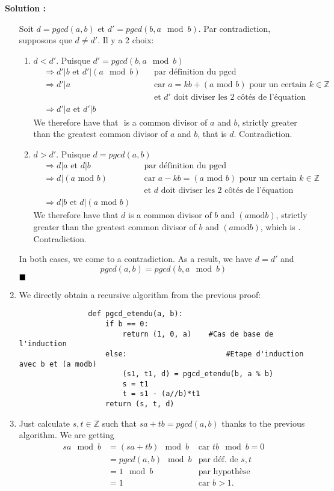 \documentclass[11pt]{article} %
\newenvironment{solution}[1][\unskip]{%
	\par
	\noindent
	\textbf{Solution #1:}
	\noindent}
{\medskip}
\begin{document}
\begin{solution}
\begin{enumerate}
			Soit $d = pgcd(a,b)$ et $d'=pgcd(b, a\mod b)$. Par contradiction, supposons que $d\neq d'$. Il y a 2 choix:
			\begin{enumerate}
				\item $d<d'$. Puisque $d' = pgcd(b, a\mod b)$
				\begin{align*}
					&\Rightarrow d'|b \text{ et } d'|(a\mod b) &&\text{par définition du pgcd}\\
					&\Rightarrow d'|a &&\text{car $a = kb + (a\text{ mod } b)$ pour un certain $k\in \mathbb{Z}$}\\
					& &&\text{et $d'$ doit diviser les 2 côtés de l'équation}\\
					&\Rightarrow d'|a \text{ et } d'|b
				\end{align*}
				We therefore have that $ $ is a common divisor of $ a $ and $ b $, strictly greater than the greatest common divisor of $ a $ and $ b $, that is $ d $. Contradiction.

				\item $d>d'$.  Puisque $d = pgcd(a,b)$
				\begin{align*}
				&\Rightarrow d|a \text{ et } d|b  &&\text{par définition du pgcd}\\
				&\Rightarrow d|(a\text{ mod }b) &&\text{car $a -kb= (a\text{ mod } b)$ pour un certain $k\in \mathbb{Z}$}\\
				& &&\text{et $d$ doit diviser les 2 côtés de l'équation}\\
				&\Rightarrow d|b \text{ et } d|(a\text{ mod }b)
				\end{align*}
				We therefore have that $ d $ is a common divisor of $ b $ and $ (a \text {mod} b) $, strictly greater than the greatest common divisor of $ b $ and $ (a \text {mod} b) $, which is $ $. Contradiction.
			\end{enumerate}
			In both cases, we come to a contradiction. As a result, we have $ d = d '$ and $$ pgcd (a, b) = pgcd (b, a \mod b) $$ $ \hfill \blacksquare $


			\item{We directly obtain a recursive algorithm from the previous proof:
				\begin{lstlisting}
				def pgcd_etendu(a, b):
					if b == 0:
						return (1, 0, a)	#Cas de base de l'induction
					else:						#Etape d'induction avec b et (a modb)
						(s1, t1, d) = pgcd_etendu(b, a % b)
						s = t1
						t = s1 - (a//b)*t1
					return (s, t, d)
				\end{lstlisting}}
			\item{Just calculate $ s, t \in \mathbb {Z} $ such that $ sa + tb = pgcd (a, b) $ thanks to the previous algorithm. We are getting
				\begin{align*}
				sa \mod b &= (sa + tb) \mod b & \text{car }tb \mod b = 0\\
				&= pgcd(a,b) \mod b & \text{par déf. de }s, t\\
				&= 1 \mod b & \text{par hypothèse}\\
				&= 1 & \text{car }b>1.
				\end{align*}}
		\end{enumerate}
	\end{solution}
\end{document}

